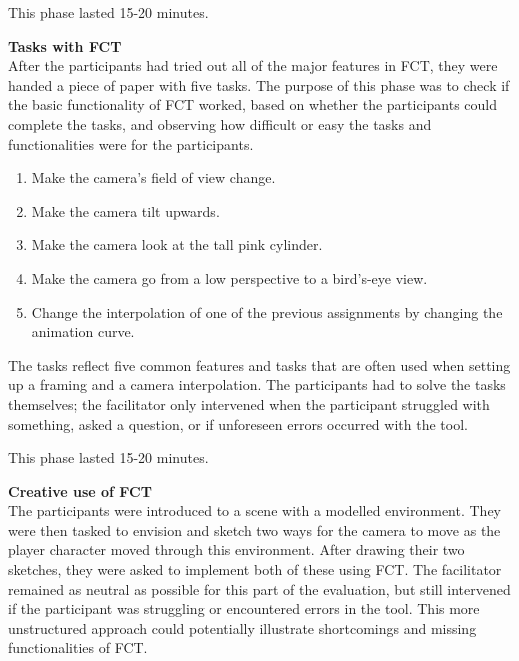 This phase lasted 15-20 minutes.

\textbf{Tasks with FCT}\\
After the participants had tried out all of the major features in FCT, they were handed a piece of paper with five tasks. The purpose of this phase was to check if  the basic functionality of FCT worked, based on whether the participants could complete the tasks, and observing how difficult or easy the tasks and functionalities were for the participants.


\begin{enumerate}
\item Make the camera's field of view change.
\item Make the camera tilt upwards.
\item Make the camera look at the tall pink cylinder.
\item Make the camera go from a low perspective to a bird's-eye view.
\item Change the interpolation of one of the previous assignments by changing the animation curve.
\end{enumerate} 

The tasks reflect five common features and tasks that are often used when setting up a framing and a camera interpolation. The participants had to solve the tasks themselves; the facilitator only intervened when the participant struggled with something, asked a question, or if unforeseen errors occurred with the tool.

This phase lasted 15-20 minutes.

\textbf{Creative use of FCT}\\
The participants were introduced to a scene with a modelled environment. They were then tasked to envision and sketch two ways for the camera to move as the player character moved through this environment. After drawing their two sketches, they were asked to implement both of these using FCT. The facilitator remained as neutral as possible for this part of the evaluation, but still intervened if the participant was struggling or encountered errors in the tool. This more unstructured approach could potentially illustrate shortcomings and missing functionalities of FCT.


